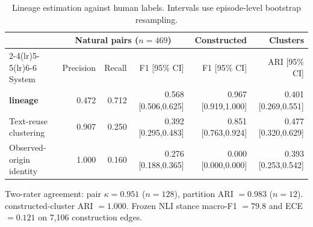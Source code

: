 \begin{table}[t]
\centering\footnotesize\setlength{\tabcolsep}{3pt}
\caption{Lineage estimation against human labels. Intervals use episode-level bootstrap resampling.}
\label{tab:edges}
\begin{tabular}{lrrrrr}
\toprule
& \multicolumn{3}{c}{Natural pairs ($n=469$)} & Constructed & Clusters \\
\cmidrule(lr){2-4}\cmidrule(lr){5-5}\cmidrule(lr){6-6}
System & Precision & Recall & F1 [95\% CI] & F1 [95\% CI] & ARI [95\% CI] \\
\midrule
\textbf{\system{} lineage} & 0.472 & 0.712 & 0.568 [0.506,0.625] & 0.967 [0.919,1.000] & 0.401 [0.269,0.551] \\
Text-reuse clustering & 0.907 & 0.250 & 0.392 [0.295,0.483] & 0.851 [0.763,0.924] & 0.477 [0.320,0.629] \\
Observed-origin identity & 1.000 & 0.160 & 0.276 [0.188,0.365] & 0.000 [0.000,0.000] & 0.393 [0.253,0.542] \\
\bottomrule
\end{tabular}\par\vspace{3pt}
{\footnotesize\raggedright
Two-rater agreement: pair $\kappa=0.951$ ($n=128$), partition ARI $=0.983$ ($n=12$). \system{} constructed-cluster ARI $=1.000$. Frozen NLI stance macro-F1 $=79.8$ and ECE $=0.121$ on 7{,}106 construction edges.\par}
\end{table}
